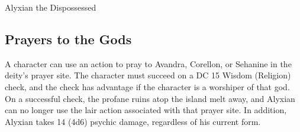 \documentclass[10pt,a4paper,twoside,twocolumn,openany,nodeprecatedcode]{dndbook}
\begin{document}
\begin{DndMonster}[float=ht]{Alyxian the Dispossessed}
\begin{description}[nolistsep]
\end{description}

\subsection{Prayers to the Gods}
A character can use an action to pray to Avandra, Corellon, or Sehanine in the deity's prayer site. The character must succeed on a DC 15 Wisdom (Religion) check, and the check has advantage if the character is a worshiper of that god. On a successful check, the profane ruins atop the island melt away, and Alyxian can no longer use the lair action associated with that prayer site. In addition, Alyxian takes 14 (4d6) psychic damage, regardless of his current form.

\end{DndMonster}


\clearpage
{}
\end{document}
